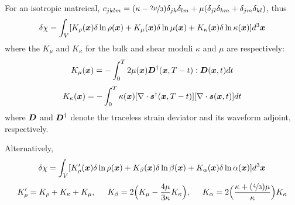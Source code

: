 For an isotropic matreical,
$c_{jklm}=(\kappa-\nicefrac{2\mu}{3})\delta_{jk}\delta_{lm}+\mu(\delta_{jl}\delta_{km}+\delta_{jm}\delta_{kl})$,
thus
\[ \delta\chi=\int_V[K_\rho(\boldsymbol{x})\delta\ln\rho(\boldsymbol{x})+K_\mu(\boldsymbol{x})\delta\ln\mu(\boldsymbol{x})+K_\kappa(\boldsymbol{x})\delta\ln\kappa(\boldsymbol{x})]d^3\boldsymbol{x} \]
where the  $K_\mu$ and $K_\kappa$
for the bulk and shear moduli $\kappa$ and $\mu$ are respectively:
\[ K_\mu(\boldsymbol{x})=-\int_0^T2\mu(\boldsymbol{x})\boldsymbol{D}^\dagger(\boldsymbol{x},T-t):\boldsymbol{D}(\boldsymbol{x},t)dt \]
\[ K_\kappa(\boldsymbol{x})=-\int_0^T\kappa(\boldsymbol{x})[\nabla\cdot\boldsymbol{s}^\dagger(\boldsymbol{x},T-t)][\nabla\cdot\boldsymbol{s}(\boldsymbol{x},t)]dt \]
where $\boldsymbol{D}$ and $\boldsymbol{D}^\dagger$
denote the traceless strain deviator and its waveform adjoint, respectively.

Alternatively,
\[ \delta\chi=\int_V[K_\rho'(\boldsymbol{x})\delta\ln\rho(\boldsymbol{x})+K_\beta(\boldsymbol{x})\delta\ln\beta(\boldsymbol{x})+K_\alpha(\boldsymbol{x})\delta\ln\alpha(\boldsymbol{x})]d^3\boldsymbol{x} \]
\[ K_\rho'=K_\rho+K_\kappa+K_\mu, \hspace{5mm} K_\beta=2\Big(K_\mu-\frac{4\mu}{3\kappa}K_\kappa\Big), \hspace{5mm} K_\alpha=2\Big(\frac{\kappa+(\nicefrac{4}{3})\mu}{\kappa}\Big)K_\kappa \]

